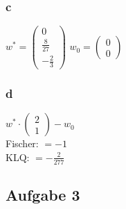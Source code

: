 \documentclass{article}
\begin{document}
	
	\subsubsection{c} 
		$w^* = 
		\begin{pmatrix}
			0 \\
			\frac{8}{27} \\
			-\frac{2}{3}
		\end{pmatrix}$
		$w_0 = 
			\begin{pmatrix}
			0 \\
			0
			\end{pmatrix}$
	\subsubsection{d}
		$w^* \cdot \begin{pmatrix}
			2\\1
		\end{pmatrix} - w_0$
		\\
		Fischer: 
		$= -1$
		\\
		KLQ:
		$= -\frac{2}{277}$

\subsection{Aufgabe 3}
\end{document}

